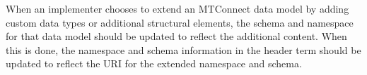 When an implementer chooses to extend an MTConnect \gls{data model} by adding custom data types or additional \glspl{structural element}, the \gls{schema} and \gls{namespace} for that \gls{data model} should be updated to reflect the additional content.  When this is done, the \gls{namespace} and \gls{schema} information in the \gls{header term} should be updated to reflect the URI for the extended \gls{namespace} and \gls{schema}. 


